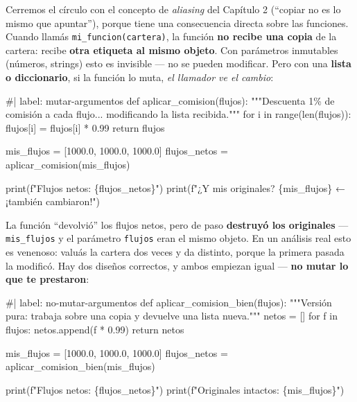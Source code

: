 \documentclass[
  spanish,
  letterpaper,
  DIV=11,
  numbers=noendperiod]{scrreprt}
\newenvironment{Shaded}{\begin{snugshade}}{\end{snugshade}}
\newcommand{\NormalTok}[1]{\textcolor[rgb]{0.00,0.23,0.31}{#1}}
\begin{document}
Cerremos el círculo con el concepto de \emph{aliasing} del Capítulo 2
(``copiar no es lo mismo que apuntar''), porque tiene una consecuencia
directa sobre las funciones. Cuando llamás
\texttt{mi\_funcion(cartera)}, la función \textbf{no recibe una copia}
de la cartera: recibe \textbf{otra etiqueta al mismo objeto}. Con
parámetros inmutables (números, strings) esto es invisible --- no se
pueden modificar. Pero con una \textbf{lista o diccionario}, si la
función lo muta, \emph{el llamador ve el cambio}:

\begin{Shaded}
\begin{Highlighting}[]
\NormalTok{\#| label: mutar{-}argumentos}
\NormalTok{def aplicar\_comision(flujos):}
\NormalTok{    """Descuenta 1\% de comisión a cada flujo... modificando la lista recibida."""}
\NormalTok{    for i in range(len(flujos)):}
\NormalTok{        flujos[i] = flujos[i] * 0.99}
\NormalTok{    return flujos}

\NormalTok{mis\_flujos = [1000.0, 1000.0, 1000.0]}
\NormalTok{flujos\_netos = aplicar\_comision(mis\_flujos)}

\NormalTok{print(f"Flujos netos:      \{flujos\_netos\}")}
\NormalTok{print(f"¿Y mis originales? \{mis\_flujos\}   ← ¡también cambiaron!")}
\end{Highlighting}
\end{Shaded}

La función ``devolvió'' los flujos netos, pero de paso \textbf{destruyó
los originales} --- \texttt{mis\_flujos} y el parámetro \texttt{flujos}
eran el mismo objeto. En un análisis real esto es venenoso: valuás la
cartera dos veces y da distinto, porque la primera pasada la modificó.
Hay dos diseños correctos, y ambos empiezan igual --- \textbf{no mutar
lo que te prestaron}:

\begin{Shaded}
\begin{Highlighting}[]
\NormalTok{\#| label: no{-}mutar{-}argumentos}
\NormalTok{def aplicar\_comision\_bien(flujos):}
\NormalTok{    """Versión pura: trabaja sobre una copia y devuelve una lista nueva."""}
\NormalTok{    netos = []}
\NormalTok{    for f in flujos:}
\NormalTok{        netos.append(f * 0.99)}
\NormalTok{    return netos}

\NormalTok{mis\_flujos = [1000.0, 1000.0, 1000.0]}
\NormalTok{flujos\_netos = aplicar\_comision\_bien(mis\_flujos)}

\NormalTok{print(f"Flujos netos:      \{flujos\_netos\}")}
\NormalTok{print(f"Originales intactos: \{mis\_flujos\}")}
\end{Highlighting}
\end{Shaded}
\end{document}
